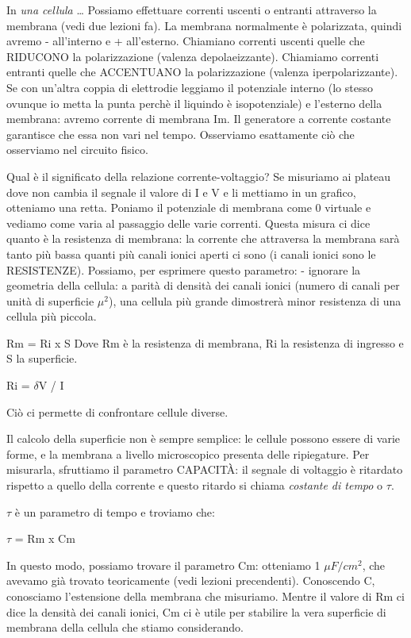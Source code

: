 \documentclass[a4paper,12pt]{article}
\begin{document}
In \emph{una cellula} \dots
Possiamo effettuare correnti uscenti o entranti attraverso la membrana (vedi due lezioni fa). La membrana normalmente è polarizzata, quindi avremo - all'interno e + all'esterno. 
Chiamiano correnti uscenti quelle che RIDUCONO la polarizzazione (valenza depolaeizzante).
Chiamiamo correnti entranti quelle che ACCENTUANO la polarizzazione (valenza iperpolarizzante).
Se con un'altra coppia di elettrodie leggiamo il potenziale interno (lo stesso ovunque io metta la punta perchè il liquindo è isopotenziale) e l'esterno della membrana: avremo corrente di membrana Im. Il generatore a corrente costante garantisce che essa non vari nel tempo. Osserviamo esattamente ciò che osserviamo nel circuito fisico.

Qual è il significato della relazione corrente-voltaggio?
Se misuriamo ai plateau dove non cambia il segnale il valore di I e V e li mettiamo in un grafico, otteniamo una retta. Poniamo il potenziale di membrana come 0 virtuale e vediamo come varia al passaggio delle varie correnti.
Questa misura ci dice quanto è la resistenza di membrana: la corrente che attraversa la membrana sarà tanto più bassa quanti più canali ionici aperti ci sono (i canali ionici sono le RESISTENZE). 
Possiamo, per esprimere questo parametro:
- ignorare la geometria della cellula: a parità di densità dei canali ionici (numero di canali per unità di superficie $\mu^{2}$), una cellula più grande dimostrerà minor resistenza di una cellula più piccola.

					Rm = Ri x S
Dove Rm è la resistenza di membrana, Ri la resistenza di ingresso e S la superficie.

					Ri = $\delta$V / I

Ciò ci permette di confrontare cellule diverse.

Il calcolo della superficie non è sempre semplice: le cellule possono essere di varie forme, e la membrana a livello microscopico presenta delle ripiegature.
Per misurarla, sfruttiamo il parametro CAPACITÀ: il segnale di voltaggio è ritardato rispetto a quello della corrente e questo ritardo si chiama \emph{costante di tempo} o $\tau$.

$\tau$ è un parametro di tempo e troviamo che:
				
					$\tau$ = Rm x Cm

In questo modo, possiamo trovare il parametro Cm: otteniamo 1 $\mu F/cm^{2}$, che avevamo già trovato teoricamente (vedi lezioni precendenti). 
Conoscendo C, conosciamo l'estensione della membrana che misuriamo.
Mentre il valore di Rm ci dice la densità dei canali ionici, Cm ci è utile per stabilire la vera superficie di membrana della cellula che stiamo considerando.
\end{document}
